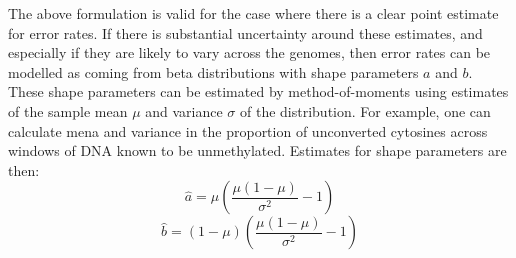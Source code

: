 \documentclass[12pt,longbibliography]{article}
\begin{document}
The above formulation is valid for the case where there is a clear point estimate for error rates.
If there is substantial uncertainty around these estimates, and especially if they are likely to vary across the genomes, then error rates can be modelled as coming from beta distributions with shape parameters $a$ and $b$.
These shape parameters can be estimated by method-of-moments using estimates of the sample mean $\mu$ and variance $\sigma$ of the distribution.
For example, one can calculate mena and variance in the proportion of unconverted cytosines across windows of DNA known to be unmethylated.
Estimates for shape parameters are then:
\begin{equation}
    \hat{a} = \mu(\frac{\mu(1-\mu)}{\sigma^2}-1)
    \label{eqn:beta-a}
\end{equation}
\begin{equation}
    \hat{b} = (1-\mu)(\frac{\mu(1-\mu)}{\sigma^2}-1) 
    \label{eqn:beta-b}
\end{equation}

\end{document}
